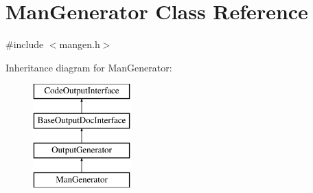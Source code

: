 \hypertarget{class_man_generator}{}\section{Man\+Generator Class Reference}
\label{class_man_generator}


{\ttfamily \#include $<$mangen.\+h$>$}

Inheritance diagram for Man\+Generator\+:\begin{figure}[H]
\begin{center}
\leavevmode
\includegraphics[height=4.000000cm]{class_man_generator}
\end{center}
\end{figure}
